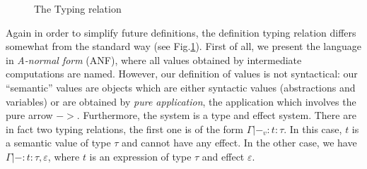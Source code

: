 \documentclass[a4paper]{llncs}
\newcommand{\letml}{{\bf let}}
\newcommand{\inml}{{\bf in}}
\newcommand{\ifml}{{\bf if}}
\newcommand{\thenml}{{\bf then}}
\newcommand{\elseml}{{\bf else}}
\newcommand{\propml}{{\bf prop}}
\newcommand{\boolml}{{\bf bool}}
\newcommand{\recml}{{\bf rec}}
\newcommand{\efft}[1]{ \langle #1 \rangle }
\newcommand{\alist}[1]{ \overline{#1} }
\begin{document}
\begin{figure}[htpb]
  \caption{The Typing relation}
  \label{fig:typing}
\end{figure}

Again in order to simplify future definitions, the definition typing relation
differs somewhat from the standard way (see Fig.\ref{fig:typing}). First of
all, we present the language in {\em A-normal form} (ANF), where all values
obtained by intermediate computations are named. However, our definition of
values is not syntactical: our ``semantic'' values are objects which are
either syntactic values (abstractions and variables) or are obtained by {\em
pure application}, the application which involves the pure arrow $->$.
Furthermore, the system is a type and effect system. There are in fact two
typing relations, the first one is of the form $Γ|-_v : t : τ$. In this case,
$t$ is a semantic value of type $τ$ and cannot have any effect. In the other
case, we have $Γ|- : t : τ, ε$, where $t$ is an expression of type $τ$ and
effect $ε$. 
\end{document}
